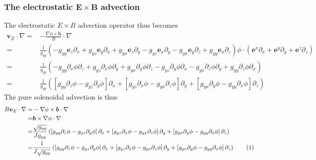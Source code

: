 \documentclass[12pt]{article}
\def\L{\left}
\def\R{\right}
\newcommand{\ve}[1]{\ensuremath{\boldsymbol{#1}}}
\newcommand\numberthis{\addtocounter{equation}{1}\tag{\theequation}}
\begin{document}
\subsubsection{The electrostatic \texorpdfstring{$\ve{E}\times \ve{B}$}{ExB}
	       advection}
%
The electrostatic $E\times B$ advection operator thus becomes
%
\begin{align*}
    \ve{v}_E\cdot\nabla
    =& -\frac{\nabla\phi\times\ve{b}}{B}\cdot\nabla\\
    =&\frac{1}{g_{yy}}
	       \L(
	       - g_{yy}\ve{e}_z\partial_x
	       + g_{yz}\ve{e}_y\partial_x
	       + g_{yx}\ve{e}_z\partial_y
	       - g_{yz}\ve{e}_x\partial_y
	       - g_{yx}\ve{e}_y\partial_z
	       + g_{yy}\ve{e}_x\partial_z
	       \R)
	       \phi
       \cdot\L(\ve{e}^x\partial_x + \ve{e}^y\partial_y + \ve{e}^z\partial_z\R)\\
    =& \frac{1}{g_{yy}}
	       \L(
	       - g_{yy}\partial_x\phi\partial_z
	       + g_{yz}\partial_x\phi\partial_y
	       + g_{yx}\partial_y\phi\partial_z
	       - g_{yz}\partial_y\phi\partial_x
	       - g_{yx}\partial_z\phi\partial_y
	       + g_{yy}\partial_z\phi\partial_x
	       \R)\\
    =& \frac{1}{g_{yy}}
	       \L(
	         \L[
	           g_{yy}\partial_z\phi
	         - g_{yz}\partial_y\phi
	         \R]\partial_x
	       +
	         \L[
	           g_{yz}\partial_x\phi
	         - g_{yx}\partial_z\phi
	         \R]\partial_y
	       +
	         \L[
	           g_{yx}\partial_y\phi
	         - g_{yy}\partial_x\phi
	         \R]\partial_z
	       \R)
\end{align*}
%
The pure solenoidal advection is thus
%
\begin{align*}
    B\ve{v}_E\cdot\nabla
    =& -\nabla\phi\times\ve{b}\cdot\nabla\\
    =& \ve{b} \times \nabla\phi\cdot\nabla\\
    =& \frac{\sqrt{g_{yy}}}{Jg_{yy}}
	       \L(
	         \L[
	           g_{yy}\partial_z\phi
	         - g_{yz}\partial_y\phi
	         \R]\partial_x
	       +
	         \L[
	           g_{yz}\partial_x\phi
	         - g_{yx}\partial_z\phi
	         \R]\partial_y
	       +
	         \L[
	           g_{yx}\partial_y\phi
	         - g_{yy}\partial_x\phi
	         \R]\partial_z
	       \R)\\
    =& \frac{1}{J\sqrt{g_{yy}}}
	       \L(
	         \L[
	           g_{yy}\partial_z\phi
	         - g_{yz}\partial_y\phi
	         \R]\partial_x
	       +
	         \L[
	           g_{yz}\partial_x\phi
	         - g_{yx}\partial_z\phi
	         \R]\partial_y
	       +
	         \L[
	           g_{yx}\partial_y\phi
	         - g_{yy}\partial_x\phi
	         \R]\partial_z
	       \R)
	       \numberthis
	       \label{eq:brackets}
\end{align*}
\end{document}
